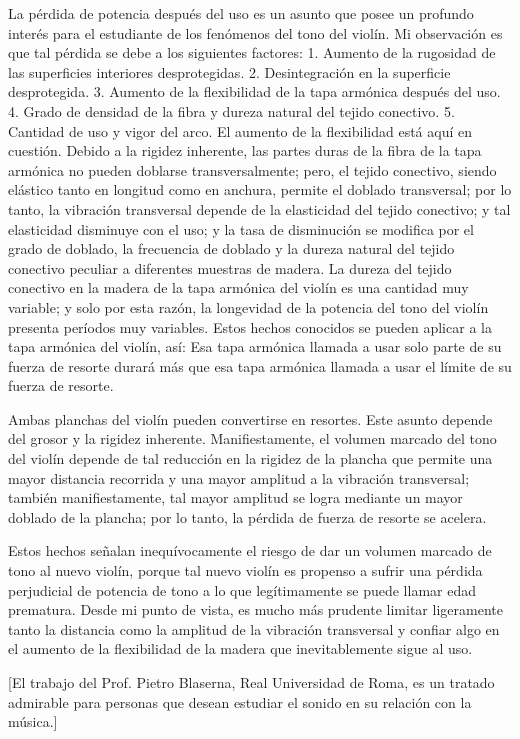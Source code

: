 \documentclass[12pt]{book}
\begin{document}
La pérdida de potencia después del uso es un asunto que posee un profundo interés para el estudiante de los fenómenos del tono del violín. Mi observación es que tal pérdida se debe a los siguientes factores: 1. Aumento de la rugosidad de las superficies interiores desprotegidas. 2. Desintegración en la superficie desprotegida. 3. Aumento de la flexibilidad de la tapa armónica después del uso. 4. Grado de densidad de la fibra y dureza natural del tejido conectivo. 5. Cantidad de uso y vigor del arco.
El aumento de la flexibilidad está aquí en cuestión. Debido a la rigidez inherente, las partes duras de la fibra de la tapa armónica no pueden doblarse transversalmente; pero, el tejido conectivo, siendo elástico tanto en longitud como en anchura, permite el doblado transversal; por lo tanto, la vibración transversal depende de la elasticidad del tejido conectivo; y tal elasticidad disminuye con el uso; y la tasa de disminución se modifica por el grado de doblado, la frecuencia de doblado y la dureza natural del tejido conectivo peculiar a diferentes muestras de madera. La dureza del tejido conectivo en la madera de la tapa armónica del violín es una cantidad muy variable; y solo por esta razón, la longevidad de la potencia del tono del violín presenta períodos muy variables. Estos hechos conocidos se pueden aplicar a la tapa armónica del violín, así: Esa tapa armónica llamada a usar solo parte de su fuerza de resorte durará más que esa tapa armónica llamada a usar el límite de su fuerza de resorte.

Ambas planchas del violín pueden convertirse en resortes. Este asunto depende del grosor y la rigidez inherente. Manifiestamente, el volumen marcado del tono del violín depende de tal reducción en la rigidez de la plancha que permite una mayor distancia recorrida y una mayor amplitud a la vibración transversal; también manifiestamente, tal mayor amplitud se logra mediante un mayor doblado de la plancha; por lo tanto, la pérdida de fuerza de resorte se acelera.

Estos hechos señalan inequívocamente el riesgo de dar un volumen marcado de tono al nuevo violín, porque tal nuevo violín es propenso a sufrir una pérdida perjudicial de potencia de tono a lo que legítimamente se puede llamar edad prematura. Desde mi punto de vista, es mucho más prudente limitar ligeramente tanto la distancia como la amplitud de la vibración transversal y confiar algo en el aumento de la flexibilidad de la madera que inevitablemente sigue al uso.

[El trabajo del Prof. Pietro Blaserna, Real Universidad de Roma, es un tratado admirable para personas que desean estudiar el sonido en su relación con la música.]
\end{document}
